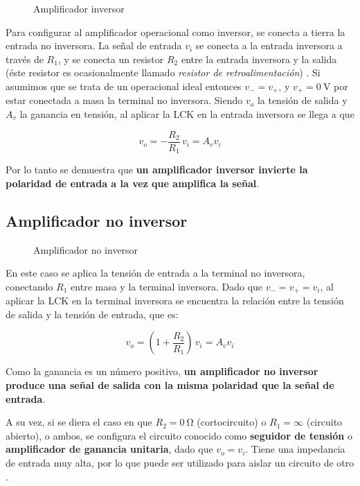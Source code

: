 \begin{wrapfigure}{r}{0.4\textwidth}
    \centering
    
    \caption{Amplificador inversor}
    \label{fig:intro:opamp-inversor}
\end{wrapfigure}


Para configurar al amplificador operacional como inversor, se conecta a tierra la entrada no inversora. La señal de entrada $v_i$ se conecta a la entrada inversora a través de $R_1$, y se conecta un resistor $R_2$ entre la entrada inversora y la salida (éste resistor es ocasionalmente llamado \textit{resistor de retroalimentación}) \cite[pág. 181]{FDCE}.
Si asumimos que se trata de un operacional ideal entonces $v_{-} = v_{+}$, y $v_{+} = \SI{0}{\volt}$ por estar conectada a masa la terminal no inversora. Siendo $v_o$ la tensión de salida y $A_v$ la ganancia en tensión, al aplicar la LCK en la entrada inversora se llega a que

\begin{equation}
    \label{ec:intro:opamp-inversor}
    v_o = - \frac{R_2}{R_1} \, v_i = A_v v_i
\end{equation}

Por lo tanto se demuestra que \textbf{un amplificador inversor invierte la polaridad de entrada a la vez que amplifica la señal}.

\subsection{Amplificador no inversor}
\label{sec:intro:opamp-noinversor}


\begin{wrapfigure}{r}{0.4\textwidth}
    \centering
    
    \caption{Amplificador no inversor}
    \label{fig:intro:opamp-no-inversor}
\end{wrapfigure}

En este caso se aplica la tensión de entrada a la terminal no inversora, conectando $R_1$ entre masa y la terminal inversora. Dado que $v_{-} = v_{+} = v_i$, al aplicar la LCK en la terminal inversora se encuentra la relación entre la tensión de salida y la tensión de entrada, que es:

\begin{equation}
    \label{ec:intro:opamp-noinversor}
    v_o = \left(1 + \frac{R_2}{R_1}\right) \, v_i = A_v v_i
\end{equation}

Como la ganancia es un número positivo, \textbf{un amplificador no inversor produce una señal de salida con la misma polaridad que la señal de entrada}.

A su vez, si se diera el caso en que $R_2 = \SI{0}{\ohm}$ (cortocircuito) o $R_1 = \infty$ (circuito abierto), o ambos, se configura el circuito conocido como \textbf{seguidor de tensión} o \textbf{amplificador de ganancia unitaria}, dado que $v_o = v_i$. Tiene una impedancia de entrada muy alta, por lo que puede ser utilizado para aislar un circuito de otro \cite[pág. 184]{FDCE}.
